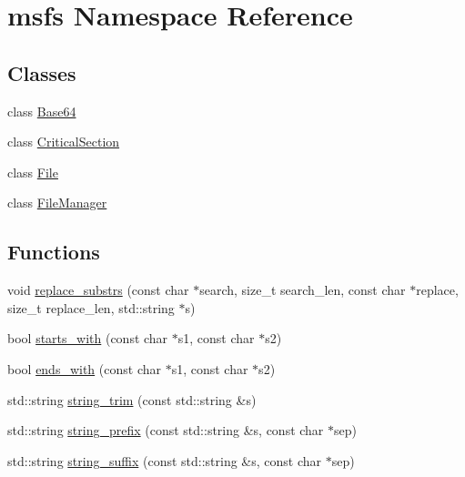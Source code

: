 \hypertarget{namespacemsfs}{}\section{msfs Namespace Reference}
\label{namespacemsfs}
\subsection*{Classes}
\begin{DoxyCompactItemize}
\item 
class \hyperlink{classmsfs_1_1_base64}{Base64}
\item 
class \hyperlink{classmsfs_1_1_critical_section}{Critical\+Section}
\item 
class \hyperlink{classmsfs_1_1_file}{File}
\item 
class \hyperlink{classmsfs_1_1_file_manager}{File\+Manager}
\end{DoxyCompactItemize}
\subsection*{Functions}
\begin{DoxyCompactItemize}
\item 
void \hyperlink{namespacemsfs_aa86d3ec3e44e8e1459a6c92601cc3852}{replace\+\_\+substrs} (const char $\ast$search, size\+\_\+t search\+\_\+len, const char $\ast$replace, size\+\_\+t replace\+\_\+len, std\+::string $\ast$s)
\item 
bool \hyperlink{namespacemsfs_a1c2b7c88c45321f360163295b416f976}{starts\+\_\+with} (const char $\ast$s1, const char $\ast$s2)
\item 
bool \hyperlink{namespacemsfs_ae757501cb599a61f13b2f5601c93a1f0}{ends\+\_\+with} (const char $\ast$s1, const char $\ast$s2)
\item 
std\+::string \hyperlink{namespacemsfs_a16a25cafec318dc5f974d37dd1dc1a45}{string\+\_\+trim} (const std\+::string \&s)
\item 
std\+::string \hyperlink{namespacemsfs_a86f031edf1e7d501662e9f2076237d66}{string\+\_\+prefix} (const std\+::string \&s, const char $\ast$sep)
\item 
std\+::string \hyperlink{namespacemsfs_a85f906e6bcc1a94dd4e1c59f79a3e02d}{string\+\_\+suffix} (const std\+::string \&s, const char $\ast$sep)
\end{DoxyCompactItemize}
